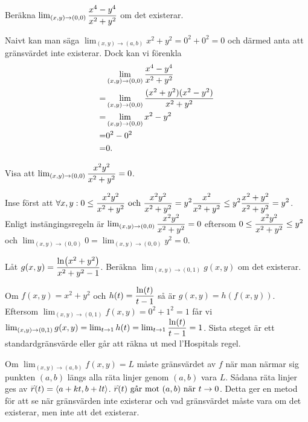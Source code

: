 \documentclass[a4paper]{article}
\begin{document}
\begin{ex}
    Beräkna \(
        \lim_{(x,y)\to (0,0)} \displaystyle\frac{x^4-y^4}{x^2+y^2} 
    \) om det existerar. 
    
    Naivt kan man säga \(
        \lim_{(x,y)\to (a,b)} x^2+y^2 = 0^2+0^2 = 0
    \) och därmed anta att gränsvärdet inte existerar.
    Dock kan vi förenkla 
    \begin{align*}
        & \lim_{(x,y)\to (0,0)} \displaystyle\frac{x^4-y^4}{x^2+y^2} \\
       =& \lim_{(x,y)\to (0,0)} \displaystyle\frac{(x^2+y^2)(x^2-y^2)}{x^2+y^2} \\
       =& \lim_{(x,y)\to (0,0)} x^2-y^2 \\
       =& 0^2 - 0^2 \\
       =& 0.
    \end{align*}
\end{ex}

\begin{ex}
    Visa att \(
        \lim_{(x,y)\to (0,0)} \displaystyle\frac{x^2y^2}{x^2+y^2} = 0 
    \). 

    Inse först att \(
        \forall x, y: 0 \leq \displaystyle\frac{x^2y^2}{x^2+y^2} \text{ och } \displaystyle\frac{x^2y^2}{x^2+y^2} = y^2 \displaystyle\frac{x^2}{x^2+y^2} \leq y^2 \displaystyle\frac{x^2+y^2}{x^2+y^2} = y^2
    \). Enligt instängingsregeln är \(
        \lim_{(x,y)\to (0,0)} \displaystyle\frac{x^2y^2}{x^2+y^2} = 0
    \) eftersom \(
        0 \leq \displaystyle\frac{x^2y^2}{x^2+y^2} \leq y^2
    \) och \(
        \lim_{(x,y)\to (0,0)} 0 = \lim_{(x,y)\to (0,0)} y^2 = 0
    \).
\end{ex}

\begin{ex}
    Låt \(
        g(x,y) = \displaystyle\frac{\ln(x^2+y^2)}{x^2+y^2-1} 
    \). Beräkna \(
        \lim_{(x,y) \to (0,1)} g(x,y)
    \) om det existerar.

    Om \(
        f(x,y) = x^2+y^2
    \) och \(
        h(t) = \displaystyle\frac{\ln(t)}{t-1} 
    \) så är \(
        g(x,y) = h(f(x,y))
    \). Eftersom \(
        \lim_{(x,y) \to (0,1)} f(x,y) = 0^2 + 1^2 = 1
    \) får vi \(
        \lim_{(x,y) \to (0,1)} g(x,y) = \lim_{t \to 1} h(t) 
        = \lim_{t \to 1} \displaystyle\frac{\ln(t)}{t-1} = 1
    \). Sista steget är ett standardgränsvärde eller går att räkna 
    ut med l'Hospitals regel. 
\end{ex}

Om \(
    \lim_{(x,y) \to (a,b)} f(x,y) = L
\) måste gränsvärdet av \(
    f
\) när man närmar sig punkten \(
    (a,b)
\) längs alla räta linjer genom \(
    (a,b)
\) vara \(
    L
\). Sådana räta linjer ges av \(
    \accentset{\rightharpoonup}{r} (t) = \left\langle a+kt, b+lt \right\rangle 
\). \(
    \accentset{\rightharpoonup}{r} (t) \text{ går mot } (a,b) \text{ när } t \to 0
\). Detta ger en metod för att se när gränsvärden inte existerar
och vad gränsvärdet måste vara om det existerar,
men inte att det existerar.
\end{document}
